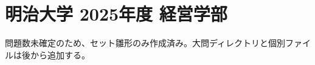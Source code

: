 \documentclass[../../uem_mei_q.tex]{subfiles}
\begin{document}
    \section{明治大学 2025年度 経営学部}

    問題数未確定のため、セット雛形のみ作成済み。大問ディレクトリと個別ファイルは後から追加する。
\end{document}
